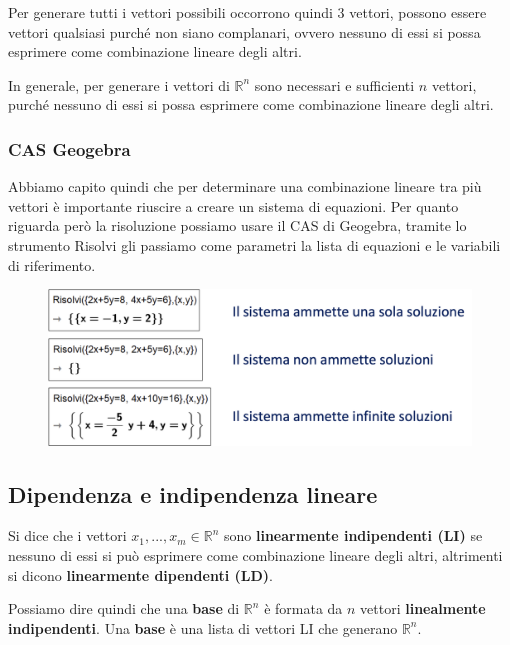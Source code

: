 \documentclass[../main.tex]{subfiles}
\begin{document}
Per generare tutti i vettori possibili occorrono quindi 3 vettori, possono essere vettori qualsiasi purché non siano complanari, ovvero nessuno di essi si possa esprimere come combinazione lineare degli altri.


In generale, per generare i vettori di $\mathbb{R}^n$ sono necessari e sufficienti $n$ vettori, purché nessuno di essi si possa esprimere come combinazione lineare degli altri.

\subsubsection{CAS Geogebra}
Abbiamo capito quindi che per determinare una combinazione lineare tra più vettori è importante riuscire a creare un sistema di equazioni. Per quanto riguarda però la risoluzione possiamo usare il CAS di Geogebra, tramite lo strumento Risolvi gli passiamo come parametri la lista di equazioni e le variabili di riferimento.
\begin{figure}[h]
    \centering
    \includegraphics[width=1\textwidth]{../images/casGeogebra.png}
\end{figure}
\pagebreak

\subsection{Dipendenza e indipendenza lineare}
Si dice che i vettori $x_1,...,x_m \in \mathbb{R}^n$ sono \textbf{linearmente indipendenti (LI)} se nessuno di essi si può esprimere come combinazione lineare degli altri,
altrimenti si dicono \textbf{linearmente dipendenti (LD)}.

Possiamo dire quindi che una \textbf{base} di $\mathbb{R}^n$ è formata da $n$ vettori \textbf{linealmente indipendenti}.
Una \textbf{base} è una lista di vettori LI che generano $\mathbb{R}^n$.
\vspace{1cm}
\end{document}
